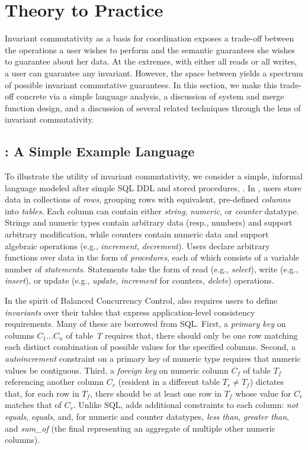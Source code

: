 
\section{Theory to Practice}
\label{sec:bcc-practice}

Invariant commutativity as a basis for coordination exposes a
trade-off between the operations a user wishes to perform and the
semantic guarantees she wishes to guarantee about her data. At the
extremes, with either all reads or all writes, a user can guarantee
any invariant. However, the space between yields a spectrum of
possible invariant commutative guarantees. In this section, we make
this trade-off concrete via a simple language analysis, a discussion
of system and merge function design, and a discussion of several
related techniques through the lens of invariant commutativity.

\subsection{\lang: A Simple Example Language}

To illustrate the utility of invariant commutativity, we consider a
simple, informal language modeled after simple SQL DDL and stored
procedures, \lang. In \lang, users store data in collections of
\textit{rows}, grouping rows with equivalent, pre-defined
\textit{columns} into \textit{tables}. Each column can contain either
\textit{string}, \textit{numeric}, or \textit{counter}
datatype. Strings and numeric types contain arbitrary data (resp.,
numbers) and support arbitrary modification, while counters contain
numeric data and support algebraic operations (e.g.,
\textit{increment}, \textit{decrement}). Users declare arbitrary
functions over data in the form of \textit{procedures}, each of which
consists of a variable number of \textit{statements}. Statements take
the form of read (e.g., \textit{select}), write (e.g.,
\textit{insert}), or update (e.g., \textit{update}, \textit{increment}
for counters, \textit{delete}) operations.

In the spirit of Balanced Concurrency Control, \lang also requires
users to define \textit{invariants} over their tables that express
application-level consistency requirements. Many of these are borrowed
from SQL. First, a \textit{primary key} on columns $C_1 \dots C_n$ of
table \textit{T} requires that, there should only be one row matching
each distinct combination of possible values for the specified
columns. Second, a \textit{autoincrement} constraint on a primary key
of numeric type requires that numeric values be contiguous. Third, a
\textit{foreign key} on numeric column $C_f$ of table $T_f$
referencing another column $C_r$ (resident in a different table $T_r
\neq T_f$) dictates that, for each row in $T_f$, there should be at
least one row in $T_f$ whose value for $C_r$ matches that of
$C_r$. Unlike SQL, \lang adds additional constraints to each column:
\textit{not equals}, \textit{equals}, and, for numeric and counter
datatypes, \textit{less than}, \textit{greater than}, and
\textit{sum\_of} (the final representing an aggregate of multiple
other numeric columns).


